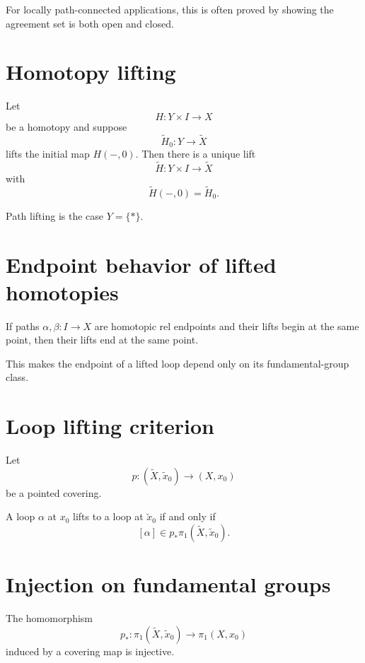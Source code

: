 For locally path-connected applications, this is often proved by showing the
agreement set is both open and closed.

\section{Homotopy lifting}

\begin{theorem}
\label{thm:viii11-homotopy-lifting}
Let
\[
H:Y\times I\to X
\]
be a homotopy and suppose
\[
\widetilde H_0:Y\to\widetilde X
\]
lifts the initial map \(H(-,0)\).  Then there is a unique lift
\[
\widetilde H:Y\times I\to\widetilde X
\]
with
\[
\widetilde H(-,0)=\widetilde H_0.
\]
\end{theorem}

Path lifting is the case \(Y=\{*\}\).

\section{Endpoint behavior of lifted homotopies}

\begin{corollary}
\label{cor:viii11-endpoints}
If paths \(\alpha,\beta:I\to X\) are homotopic rel endpoints and their lifts
begin at the same point, then their lifts end at the same point.
\end{corollary}

This makes the endpoint of a lifted loop depend only on its fundamental-group
class.

\section{Loop lifting criterion}

Let
\[
p:(\widetilde X,\tilde x_0)\to(X,x_0)
\]
be a pointed covering.

\begin{proposition}
\label{prop:viii11-loop-criterion}
A loop \(\alpha\) at \(x_0\) lifts to a loop at \(\tilde x_0\) if and only if
\[
[\alpha]\in
p_*\pi_1(\widetilde X,\tilde x_0).
\]
\end{proposition}

\section{Injection on fundamental groups}

\begin{theorem}
\label{thm:viii11-pi1-injective}
The homomorphism
\[
p_*:\pi_1(\widetilde X,\tilde x_0)
\to
\pi_1(X,x_0)
\]
induced by a covering map is injective.
\end{theorem}

